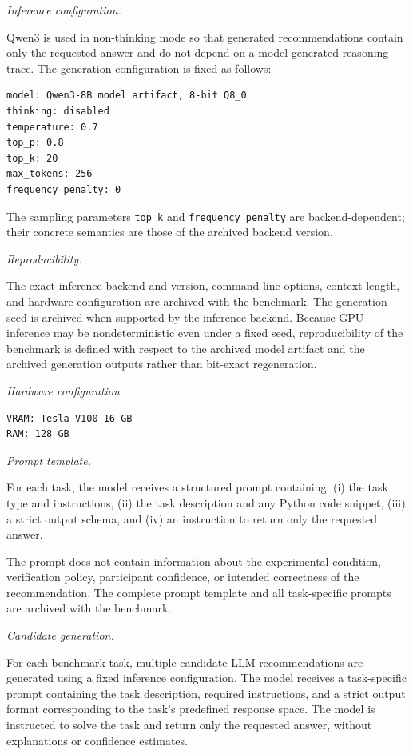 \documentclass[oneside,final,14pt,a4paper]{extreport}
\begin{document}
\emph{Inference configuration.}

Qwen3 is used in non-thinking mode so that generated recommendations contain
only the requested answer and do not depend on a model-generated reasoning
trace. The generation configuration is fixed as follows:

\begin{verbatim}
model: Qwen3-8B model artifact, 8-bit Q8_0
thinking: disabled
temperature: 0.7
top_p: 0.8
top_k: 20
max_tokens: 256
frequency_penalty: 0
\end{verbatim}

The sampling parameters \texttt{top\_k} and \texttt{frequency\_penalty} are
backend-dependent; their concrete semantics are those of the archived backend
version.

\emph{Reproducibility.}

The exact inference backend and version, command-line options, context
length, and hardware configuration are archived with the benchmark. The
generation seed is archived when supported by the inference backend. Because
GPU inference may be nondeterministic even under a fixed seed, reproducibility
of the benchmark is defined with respect to the archived model artifact and
the archived generation outputs rather than bit-exact regeneration.

\emph{Hardware configuration}
\begin{verbatim}
VRAM: Tesla V100 16 GB
RAM: 128 GB
\end{verbatim}

\emph{Prompt template.}

For each task, the model receives a structured prompt containing:
(i) the task type and instructions, (ii) the task description and any Python
code snippet, (iii) a strict output schema, and (iv) an instruction to return
only the requested answer.

The prompt does not contain information about the experimental condition,
verification policy, participant confidence, or intended correctness of the
recommendation. The complete prompt template and all task-specific prompts are
archived with the benchmark.

\emph{Candidate generation.}

For each benchmark task, multiple candidate LLM recommendations are 
generated using a fixed inference configuration. The model receives 
a task-specific prompt containing the task description, required instructions, 
and a strict output format corresponding to the task's predefined response 
space. The model is instructed to solve the task and return only the 
requested answer, without explanations or confidence estimates.
\end{document}
